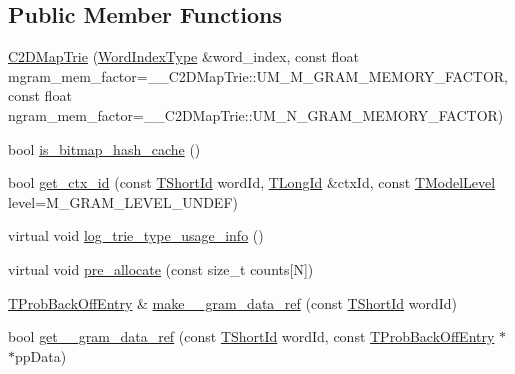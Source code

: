 \subsection*{Public Member Functions}
\begin{DoxyCompactItemize}
\item 
\hyperlink{classuva_1_1smt_1_1tries_1_1_c2_d_map_trie_af365c4463b6c65e2fea0214c6279cf66}{C2\+D\+Map\+Trie} (\hyperlink{classuva_1_1smt_1_1tries_1_1_word_index_trie_base_a30c4fffe3a3423c87b229b66340dd2f8}{Word\+Index\+Type} \&word\+\_\+index, const float mgram\+\_\+mem\+\_\+factor=\+\_\+\+\_\+\+C2\+D\+Map\+Trie\+::\+U\+M\+\_\+\+M\+\_\+\+G\+R\+A\+M\+\_\+\+M\+E\+M\+O\+R\+Y\+\_\+\+F\+A\+C\+T\+O\+R, const float ngram\+\_\+mem\+\_\+factor=\+\_\+\+\_\+\+C2\+D\+Map\+Trie\+::\+U\+M\+\_\+\+N\+\_\+\+G\+R\+A\+M\+\_\+\+M\+E\+M\+O\+R\+Y\+\_\+\+F\+A\+C\+T\+O\+R)
\item 
bool \hyperlink{classuva_1_1smt_1_1tries_1_1_c2_d_map_trie_a89f0d7873eede7eed72f675873cdd4c7}{is\+\_\+bitmap\+\_\+hash\+\_\+cache} ()
\item 
bool \hyperlink{classuva_1_1smt_1_1tries_1_1_c2_d_map_trie_aa2b36f3a32fb6f39b0f8b2948d08d9b5}{get\+\_\+ctx\+\_\+id} (const \hyperlink{namespaceuva_1_1smt_1_1hashing_adcf22e1982ad09d3a63494c006267469}{T\+Short\+Id} word\+Id, \hyperlink{namespaceuva_1_1smt_1_1hashing_a5992ac0dea0fb3226fb403ede09fad55}{T\+Long\+Id} \&ctx\+Id, const \hyperlink{namespaceuva_1_1smt_1_1tries_a20577a44b3a42d26524250634379b7cb}{T\+Model\+Level} level=M\+\_\+\+G\+R\+A\+M\+\_\+\+L\+E\+V\+E\+L\+\_\+\+U\+N\+D\+E\+F)
\item 
virtual void \hyperlink{classuva_1_1smt_1_1tries_1_1_c2_d_map_trie_a46ad9648fe8d01dfdf788c7635186065}{log\+\_\+trie\+\_\+type\+\_\+usage\+\_\+info} ()
\item 
virtual void \hyperlink{classuva_1_1smt_1_1tries_1_1_c2_d_map_trie_a08cafa610b309f25bbd3926dbe139e4d}{pre\+\_\+allocate} (const size\+\_\+t counts\mbox{[}N\mbox{]})
\item 
\hyperlink{structuva_1_1smt_1_1tries_1_1_t_prob_back_off_entry}{T\+Prob\+Back\+Off\+Entry} \& \hyperlink{classuva_1_1smt_1_1tries_1_1_c2_d_map_trie_a803e3f79b59aea301d947dc6a9ae6f43}{make\+\_\+\_\+gram\+\_\+data\+\_\+ref} (const \hyperlink{namespaceuva_1_1smt_1_1hashing_adcf22e1982ad09d3a63494c006267469}{T\+Short\+Id} word\+Id)
\item 
bool \hyperlink{classuva_1_1smt_1_1tries_1_1_c2_d_map_trie_a99d5c24c6b464ed85990a610c0105aca}{get\+\_\+\_\+gram\+\_\+data\+\_\+ref} (const \hyperlink{namespaceuva_1_1smt_1_1hashing_adcf22e1982ad09d3a63494c006267469}{T\+Short\+Id} word\+Id, const \hyperlink{structuva_1_1smt_1_1tries_1_1_t_prob_back_off_entry}{T\+Prob\+Back\+Off\+Entry} $\ast$$\ast$pp\+Data)
$$
\end{DoxyCompactItemize}
